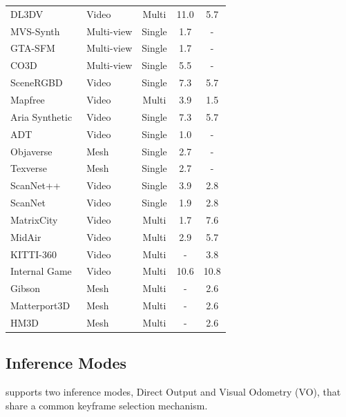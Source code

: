 \begin{table}[t]
\begin{tabular}{llc | cc}
DL3DV~\cite{ling2024dl3dv}          & Video      & Multi  & 11.0 & 5.7  \\
MVS-Synth~\cite{huang2018deepmvs}      & Multi-view & Single & 1.7  & -    \\
GTA-SFM~\cite{wang2020flow}      & Multi-view & Single & 1.7  & -    \\
CO3D~\cite{reizenstein2021common}          & Multi-view & Single & 5.5  & -    \\
SceneRGBD~\cite{McCormac:etal:ICCV2017}     & Video      & Single & 7.3  & 5.7  \\
Mapfree~\cite{arnold2022map}       & Video      & Multi  & 3.9  & 1.5  \\
Aria Synthetic~\cite{pan2023aria} & Video      & Single & 7.3  & 5.7  \\
ADT~\cite{pan2023aria}            & Video      & Single & 1.0  & -    \\
Objaverse~\cite{deitke2023objaverse}      & Mesh & Single & 2.7  & -    \\
Texverse~\cite{zhang2025texverse}       & Mesh & Single & 2.7  & -    \\
ScanNet++~\cite{yeshwanth2023scannet++}      & Video      & Single & 3.9  & 2.8  \\
ScanNet~\cite{dai2017scannet}        & Video      & Single & 1.9  & 2.8  \\
MatrixCity~\cite{li2023matrixcity}     & Video      & Multi  & 1.7  & 7.6  \\
MidAir~\cite{Fonder2019MidAir}         & Video      & Multi  & 2.9  & 5.7  \\
KITTI-360~\cite{liao2022kitti}      & Video      & Multi  & -    & 3.8  \\
Internal Game  & Video      & Multi  & 10.6 & 10.8 \\
Gibson~\cite{xia2018gibson}  & Mesh      & Multi  & - & 2.6 \\
Matterport3D~\cite{chang2017matterport3d}  & Mesh      & Multi  & - & 2.6 \\
HM3D~\cite{ramakrishnan2021hm3d}  & Mesh      & Multi  & - & 2.6 \\
\bottomrule
\end{tabular}%
\end{table}

\subsection{Inference Modes}
\label{sec:inference_mode}

\method supports two inference modes, Direct Output and Visual
Odometry (VO), that share a common keyframe selection mechanism.

